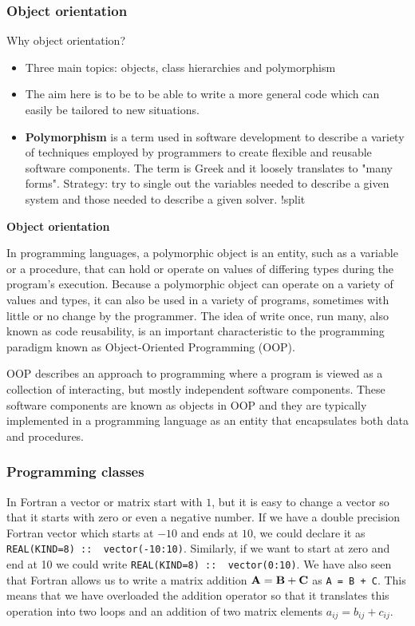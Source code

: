 \documentclass[handout]{beamer}
\begin{document}
\begin{frame}
\frametitle{Object orientation}

Why object orientation?

\begin{itemize}
  \item Three main topics: objects, class hierarchies and polymorphism

  \item The aim here is to be to be able to write a more general code which can easily be tailored to new situations.

  \item {\bf Polymorphism} is a term used in software development to describe a variety of techniques employed by programmers to create flexible and reusable software components. The term is Greek and it loosely translates to "many forms". Strategy: try to single out the variables needed to describe a given system and those needed to describe a given solver. !split
\end{itemize}

\noindent
\noindent\textbf{\large Object orientation}

In programming languages, a polymorphic object is an entity, such as a variable or a procedure, that can hold or operate on values of differing types during the program's execution. Because a polymorphic object can operate on a variety of values and types, it can also be used in a variety of programs, sometimes with little or no change by the programmer. The idea of write once, run many, also known as code reusability, is an important characteristic to the programming paradigm known as Object-Oriented Programming (OOP).

OOP describes an approach to programming where a program is viewed as a collection of interacting, but mostly independent software components. These software components are known as objects in OOP and they are typically implemented in a programming language as an entity that encapsulates both data and procedures.
\end{frame}

\begin{frame}
\frametitle{Programming classes}

In Fortran a vector or matrix start with $1$, but it is easy
to change a vector so that it starts with zero or even a negative number.
If we have a double precision Fortran vector  which starts at $-10$ and ends at $10$, we could declare it as
\Verb!REAL(KIND=8) ::  vector(-10:10)!. Similarly, if we want to start at zero and end at 10 we could write
\Verb!REAL(KIND=8) ::  vector(0:10)!.
We have also seen that Fortran  allows us to write a matrix addition ${\bf A} = {\bf B}+{\bf C}$ as
\Verb!A = B + C!.  This means that we have overloaded the addition operator so that it translates this operation into
two loops and an addition of two matrix elements $a_{ij} = b_{ij}+c_{ij}$.
\end{frame}
\end{document}
